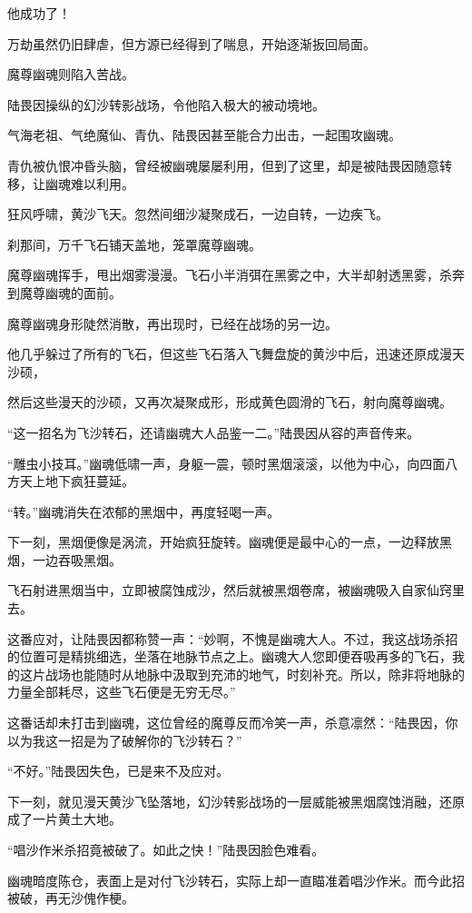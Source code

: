 \begin{this_body}
他成功了！

万劫虽然仍旧肆虐，但方源已经得到了喘息，开始逐渐扳回局面。

魔尊幽魂则陷入苦战。

陆畏因操纵的幻沙转影战场，令他陷入极大的被动境地。

气海老祖、气绝魔仙、青仇、陆畏因甚至能合力出击，一起围攻幽魂。

青仇被仇恨冲昏头脑，曾经被幽魂屡屡利用，但到了这里，却是被陆畏因随意转移，让幽魂难以利用。

狂风呼啸，黄沙飞天。忽然间细沙凝聚成石，一边自转，一边疾飞。

刹那间，万千飞石铺天盖地，笼罩魔尊幽魂。

魔尊幽魂挥手，甩出烟雾漫漫。飞石小半消弭在黑雾之中，大半却射透黑雾，杀奔到魔尊幽魂的面前。

魔尊幽魂身形陡然消散，再出现时，已经在战场的另一边。

他几乎躲过了所有的飞石，但这些飞石落入飞舞盘旋的黄沙中后，迅速还原成漫天沙硕，

然后这些漫天的沙硕，又再次凝聚成形，形成黄色圆滑的飞石，射向魔尊幽魂。

“这一招名为飞沙转石，还请幽魂大人品鉴一二。”陆畏因从容的声音传来。

“雕虫小技耳。”幽魂低啸一声，身躯一震，顿时黑烟滚滚，以他为中心，向四面八方天上地下疯狂蔓延。

“转。”幽魂消失在浓郁的黑烟中，再度轻喝一声。

下一刻，黑烟便像是涡流，开始疯狂旋转。幽魂便是最中心的一点，一边释放黑烟，一边吞吸黑烟。

飞石射进黑烟当中，立即被腐蚀成沙，然后就被黑烟卷席，被幽魂吸入自家仙窍里去。

这番应对，让陆畏因都称赞一声：“妙啊，不愧是幽魂大人。不过，我这战场杀招的位置可是精挑细选，坐落在地脉节点之上。幽魂大人您即便吞吸再多的飞石，我的这片战场也能随时从地脉中汲取到充沛的地气，时刻补充。所以，除非将地脉的力量全部耗尽，这些飞石便是无穷无尽。”

这番话却未打击到幽魂，这位曾经的魔尊反而冷笑一声，杀意凛然：“陆畏因，你以为我这一招是为了破解你的飞沙转石？”

“不好。”陆畏因失色，已是来不及应对。

下一刻，就见漫天黄沙飞坠落地，幻沙转影战场的一层威能被黑烟腐蚀消融，还原成了一片黄土大地。

“唱沙作米杀招竟被破了。如此之快！”陆畏因脸色难看。

幽魂暗度陈仓，表面上是对付飞沙转石，实际上却一直瞄准着唱沙作米。而今此招被破，再无沙傀作梗。


\end{this_body}
